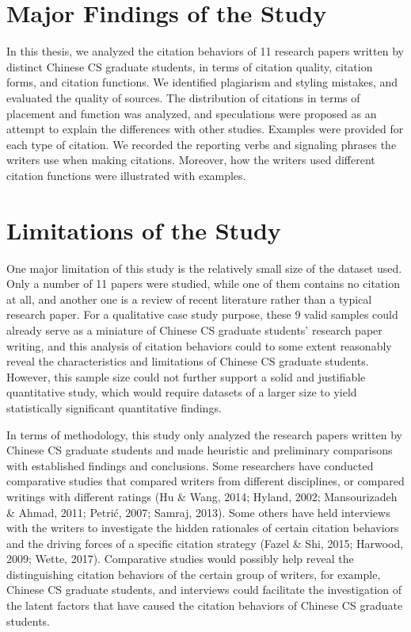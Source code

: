 \section{Major Findings of the Study}
In this thesis, we analyzed the citation behaviors of 11 research papers written by distinct Chinese CS graduate students, in terms of citation quality, citation forms, and citation functions. We identified plagiarism and styling mistakes, and evaluated the quality of sources. The distribution of citations in terms of placement and function was analyzed, and speculations were proposed as an attempt to explain the differences with other studies. Examples were provided for each type of citation. We recorded the reporting verbs and signaling phrases the writers use when making citations. Moreover, how the writers used different citation functions were illustrated with examples.

\section{Limitations of the Study}

One major limitation of this study is the relatively small size of the dataset used. Only a number of 11 papers were studied, while one of them contains no citation at all, and another one is a review of recent literature rather than a typical research paper. For a qualitative case study purpose, these 9 valid samples could already serve as a miniature of Chinese CS graduate students’ research paper writing, and this analysis of citation behaviors could to some extent reasonably reveal the characteristics and limitations of Chinese CS graduate students. However, this sample size could not further support a solid and justifiable quantitative study, which would require datasets of a larger size to yield statistically significant quantitative findings.

In terms of methodology, this study only analyzed the research papers written by Chinese CS graduate students and made heuristic and preliminary comparisons with established findings and conclusions. Some researchers have conducted comparative studies that compared writers from different disciplines, or compared writings with different ratings (Hu \& Wang, 2014; Hyland, 2002; Mansourizadeh \& Ahmad, 2011; Petrić, 2007; Samraj, 2013). Some others have held interviews with the writers to investigate the hidden rationales of certain citation behaviors and the driving forces of a specific citation strategy (Fazel \& Shi, 2015; Harwood, 2009; Wette, 2017). Comparative studies would possibly help reveal the distinguishing citation behaviors of the certain group of writers, for example, Chinese CS graduate students, and interviews could facilitate the investigation of the latent factors that have caused the citation behaviors of Chinese CS graduate students.

